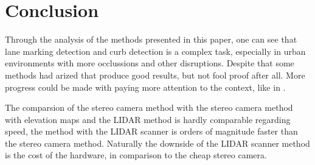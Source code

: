 \documentclass[conference]{IEEEtran}
\begin{document}
\section{Conclusion}
Through the analysis of the methods presented in this paper, one can see that lane marking detection and curb detection is a complex task, especially in urban environments with more occlussions and other disruptions. Despite that some methods had arized that produce good results, but not fool proof after all. More progress could be made with paying more attention to the context, like in \cite{virtuallane}.

The comparsion of the stereo camera method with the stereo camera method with elevation maps and the LIDAR method is hardly comparable regarding speed, the method with the LIDAR scanner is orders of magnitude faster than the stereo camera method. Naturally the downside of the LIDAR scanner method is the cost of the hardware, in comparison to the cheap stereo camera. 


\nocite{*}





\end{document}
